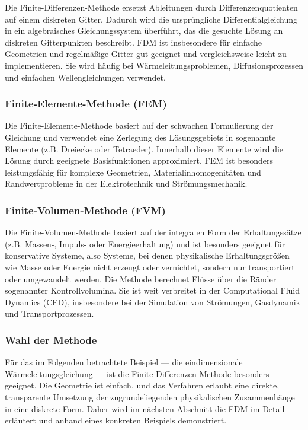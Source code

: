 Die Finite-Differenzen-Methode ersetzt Ableitungen durch Differenzenquotienten auf einem diskreten Gitter.
Dadurch wird die ursprüngliche Differentialgleichung in ein algebraisches Gleichungssystem überführt, das die gesuchte Lösung an diskreten Gitterpunkten beschreibt.
FDM ist insbesondere für einfache Geometrien und regelmäßige Gitter gut geeignet und vergleichsweise leicht zu implementieren.
Sie wird häufig bei Wärmeleitungsproblemen, Diffusionsprozessen und einfachen Wellengleichungen verwendet.

\subsubsection{Finite-Elemente-Methode (FEM)}

Die Finite-Elemente-Methode basiert auf der schwachen Formulierung der Gleichung und verwendet eine Zerlegung des Lösungsgebiets in sogenannte Elemente (z.B. Dreiecke oder Tetraeder).
Innerhalb dieser Elemente wird die Lösung durch geeignete Basisfunktionen approximiert.
FEM ist besonders leistungsfähig für komplexe Geometrien, Materialinhomogenitäten und Randwertprobleme in der Elektrotechnik und Strömungsmechanik.

\subsubsection{Finite-Volumen-Methode (FVM)}

Die Finite-Volumen-Methode basiert auf der integralen Form der Erhaltungssätze (z.B. Massen-, Impuls- oder Energieerhaltung) und ist besonders geeignet für konservative Systeme, also Systeme, bei denen physikalische Erhaltungsgrößen wie Masse oder Energie nicht erzeugt oder vernichtet, sondern nur transportiert oder umgewandelt werden.
Die Methode berechnet Flüsse über die Ränder sogenannter Kontrollvolumina.
Sie ist weit verbreitet in der Computational Fluid Dynamics (CFD), insbesondere bei der Simulation von Strömungen, Gasdynamik und Transportprozessen.

\subsubsection{Wahl der Methode}

Für das im Folgenden betrachtete Beispiel --- die eindimensionale Wärmeleitungsgleichung --- ist die Finite-Differenzen-Methode besonders geeignet.
Die Geometrie ist einfach, und das Verfahren erlaubt eine direkte, transparente Umsetzung der zugrundeliegenden physikalischen Zusammenhänge in eine diskrete Form.
Daher wird im nächsten Abschnitt die FDM im Detail erläutert und anhand eines konkreten Beispiels demonstriert.

